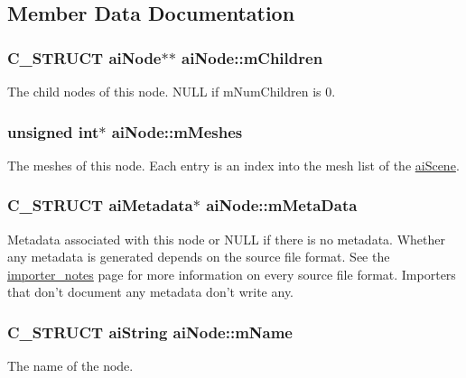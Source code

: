 \subsection{Member Data Documentation}
\hypertarget{structai_node_ac700679f0d4971f124e8444f68057291}{
\subsubsection[{m\-Children}]{\setlength{\rightskip}{0pt plus 5cm}C\-\_\-\-S\-T\-R\-U\-C\-T {\bf ai\-Node}$\ast$$\ast$ ai\-Node\-::m\-Children}}\label{structai_node_ac700679f0d4971f124e8444f68057291}
The child nodes of this node. N\-U\-L\-L if m\-Num\-Children is 0. \hypertarget{structai_node_acd1706d6508b31916c18e39b7085ca63}{
\subsubsection[{m\-Meshes}]{\setlength{\rightskip}{0pt plus 5cm}unsigned int$\ast$ ai\-Node\-::m\-Meshes}}\label{structai_node_acd1706d6508b31916c18e39b7085ca63}
The meshes of this node. Each entry is an index into the mesh list of the \hyperlink{structai_scene}{ai\-Scene}. \hypertarget{structai_node_a111b5a6cbc5dccde0cf2a17a6e5c3b67}{
\subsubsection[{m\-Meta\-Data}]{\setlength{\rightskip}{0pt plus 5cm}C\-\_\-\-S\-T\-R\-U\-C\-T {\bf ai\-Metadata}$\ast$ ai\-Node\-::m\-Meta\-Data}}\label{structai_node_a111b5a6cbc5dccde0cf2a17a6e5c3b67}
Metadata associated with this node or N\-U\-L\-L if there is no metadata. Whether any metadata is generated depends on the source file format. See the \hyperlink{}{importer\-\_\-notes} page for more information on every source file format. Importers that don't document any metadata don't write any. \hypertarget{structai_node_afa528a7e43e15d92a920229b1ff094f6}{
\subsubsection[{m\-Name}]{\setlength{\rightskip}{0pt plus 5cm}C\-\_\-\-S\-T\-R\-U\-C\-T {\bf ai\-String} ai\-Node\-::m\-Name}}\label{structai_node_afa528a7e43e15d92a920229b1ff094f6}
The name of the node.


